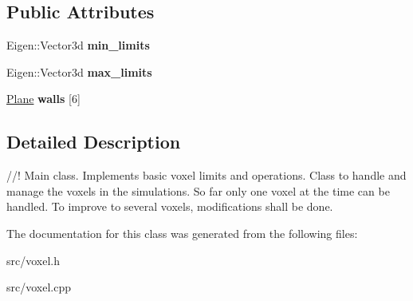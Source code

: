 \subsection*{Public Attributes}
\begin{DoxyCompactItemize}
\item 
\mbox{\label{class_voxel_a8f82e23dc4dd9b0a3df065b876525fb4}} 
Eigen\+::\+Vector3d {\bfseries min\+\_\+limits}
\item 
\mbox{\label{class_voxel_a5ffa055c53543ad2dd0944c0667b0787}} 
Eigen\+::\+Vector3d {\bfseries max\+\_\+limits}
\item 
\mbox{\label{class_voxel_a9cce047be8fe658b21dbaef698b8b5ae}} 
\hyperlink{class_plane}{Plane} {\bfseries walls} \mbox{[}6\mbox{]}
\end{DoxyCompactItemize}


\subsection{Detailed Description}
//! Main class. Implements basic voxel limits and operations. Class to handle and manage the voxels in the simulations. So far only one voxel at the time can be handled. To improve to several voxels, modifications shall be done. 

The documentation for this class was generated from the following files\+:\begin{DoxyCompactItemize}
\item 
src/voxel.\+h\item 
src/voxel.\+cpp\end{DoxyCompactItemize}
